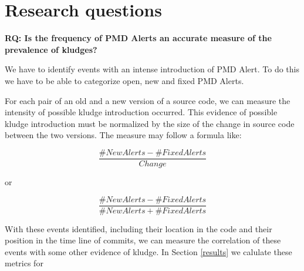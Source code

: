 \documentclass[
]{article}
\begin{document}

\section{Research questions}
\label{as_whole}


\noindent
\textbf{RQ: Is the frequency of PMD Alerts an accurate measure of the prevalence of kludges?}

We have to identify events with an intense introduction of PMD Alert. To
do this we have to be able to categorize open, new and fixed PMD Alerts.

%
%

For each pair of an old and a new version of a source code, we can
measure the intensity of possible kludge introduction occurred. This
evidence of possible kludge introduction must be normalized by the size
of the change in source code between the two versions. The measure may
follow a formula like:

\[ \frac{\#NewAlerts - \#FixedAlerts}{Change}    \]

or

\[ \frac{\#NewAlerts - \#FixedAlerts}{\#NewAlerts + \#FixedAlerts}    \]



%
%

With these events identified, including their location in the code and
their position in the time line of commits, we can measure the
correlation of these events with some other evidence of kludge. In
Section \ref{results} we calulate these metrics for


\end{document}
